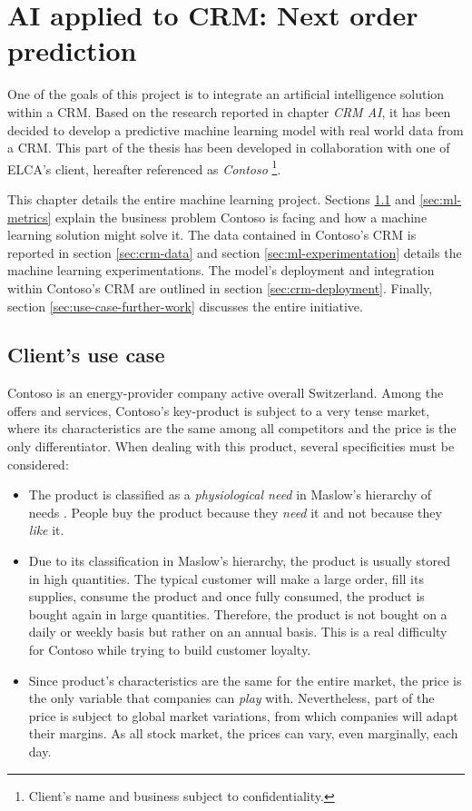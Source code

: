 \chapter{AI applied to CRM: Next order prediction} \label{chapter:use-case}

One of the goals of this project is to integrate an artificial intelligence solution within a CRM. Based on the research reported in chapter \textit{CRM AI}, it has been decided to develop a predictive machine learning model with real world data from a CRM. This part of the thesis has been developed in collaboration with one of ELCA's client, hereafter referenced as \textit{Contoso} \footnote{Client's name and business subject to confidentiality.}.

This chapter details the entire machine learning project. Sections \ref{sec:use-case} and \ref{sec:ml-metrics} explain the business problem Contoso is facing and how a machine learning solution might solve it. The data contained in Contoso's CRM is reported in section \ref{sec:crm-data} and section \ref{sec:ml-experimentation} details the machine learning experimentations. The model's deployment and integration within Contoso's CRM are outlined in section \ref{sec:crm-deployment}. Finally, section \ref{sec:use-case-further-work} discusses the entire initiative.

\section{Client's use case} \label{sec:use-case}
Contoso is an energy-provider company active overall Switzerland. Among the offers and services, Contoso's key-product is subject to a very tense market, where its characteristics are the same among all competitors and the price is the only differentiator. When dealing with this product, several specificities must be considered:
\begin{itemize}
\item The product is classified as a \textit{physiological need} in Maslow's hierarchy of needs \cite{def:Maslow}. People buy the product because they \textit{need} it and not because they \textit{like} it.
\item Due to its classification in Maslow's hierarchy, the product is usually stored in high quantities. The typical customer will make a large order, fill its supplies, consume the product and once fully consumed, the product is bought again in large quantities. Therefore, the product is not bought on a daily or weekly basis but rather on an annual basis. This is a real difficulty for Contoso while trying to build customer loyalty.
\item Since product's characteristics are the same for the entire market, the price is the only variable that companies can \textit{play} with. Nevertheless, part of the price is subject to global market variations, from which companies will adapt their margins. As all stock market, the prices can vary, even marginally, each day.
\end{itemize}

